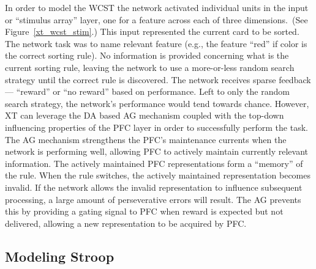 In order to model the WCST the network activated individual units in the input or ``stimulus array'' layer, one for a feature across each of three dimensions.~(See Figure~\ref{xt_wcst_stim}.)  This input represented the current card to be sorted.  The network task was to name relevant feature (e.g., the feature ``red'' if color is the correct sorting rule).  No information is provided concerning what is the current sorting rule, leaving the network to use a more-or-less random search strategy until the correct rule is discovered.  The network receives sparse feedback --- ``reward'' or ``no reward'' based on performance.  Left to only the random search strategy, the network's performance would tend towards chance.  However, XT can leverage the DA based AG mechanism coupled with the top-down influencing properties of the PFC layer in order to successfully perform the task.  The AG mechanism strengthens the PFC's maintenance currents when the network is performing well, allowing PFC to actively maintain currently relevant information.  The actively maintained PFC representations form a ``memory'' of the rule.  When the rule switches, the actively maintained representation becomes invalid.  If the network allows the invalid representation to influence subsequent processing, a large amount of perseverative errors will result.  The AG prevents this by providing a gating signal to PFC when reward is expected but not delivered, allowing a new representation to be acquired by PFC.



%
%
%


\subsection{Modeling Stroop} 


